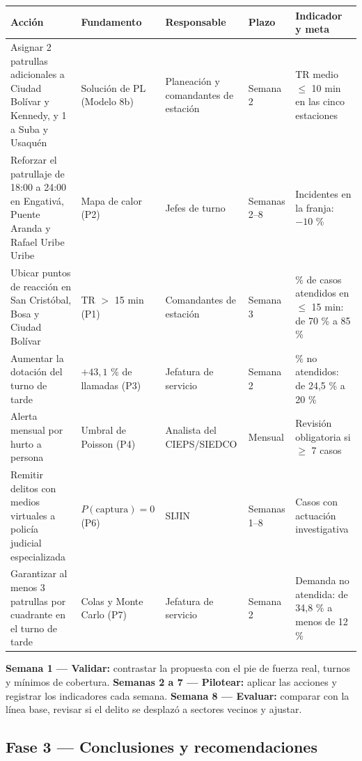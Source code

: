 \begin{center}
\scriptsize
\begin{tabularx}{\textwidth}{@{}p{3.3cm}p{2.6cm}p{2.1cm}p{1.4cm}X@{}}
\toprule
\textbf{Acción} & \textbf{Fundamento} & \textbf{Responsable} & \textbf{Plazo} & \textbf{Indicador y meta}\\
\midrule
Asignar 2 patrullas adicionales a Ciudad Bolívar y Kennedy, y 1 a Suba y Usaquén & Solución de PL (Modelo 8b) & Planeación y comandantes de estación & Semana 2 & TR medio $\le$ 10 min en las cinco estaciones\\[3pt]
Reforzar el patrullaje de 18:00 a 24:00 en Engativá, Puente Aranda y Rafael Uribe Uribe & Mapa de calor (P2) & Jefes de turno & Semanas 2--8 & Incidentes en la franja: $-10$ \%\\[3pt]
Ubicar puntos de reacción en San Cristóbal, Bosa y Ciudad Bolívar & TR $>$ 15 min (P1) & Comandantes de estación & Semana 3 & \% de casos atendidos en $\le$ 15 min: de 70 \% a 85 \%\\[3pt]
Aumentar la dotación del turno de tarde & $+43{,}1$ \% de llamadas (P3) & Jefatura de servicio & Semana 2 & \% no atendidos: de 24,5 \% a 20 \%\\[3pt]
Alerta mensual por hurto a persona & Umbral de Poisson (P4) & Analista del CIEPS/SIEDCO & Mensual & Revisión obligatoria si $\ge$ 7 casos\\[3pt]
Remitir delitos con medios virtuales a policía judicial especializada & $P(\text{captura})=0$ (P6) & SIJIN & Semanas 1--8 & Casos con actuación investigativa\\[3pt]
Garantizar al menos 3 patrullas por cuadrante en el turno de tarde & Colas y Monte Carlo (P7) & Jefatura de servicio & Semana 2 & Demanda no atendida: de 34,8 \% a menos de 12 \%\\
\bottomrule
\end{tabularx}
\end{center}

\begin{cajaInfo}
\textbf{Semana 1 --- Validar:} contrastar la propuesta con el pie de fuerza real, turnos y
mínimos de cobertura. \textbf{Semanas 2 a 7 --- Pilotear:} aplicar las acciones y registrar
los indicadores cada semana. \textbf{Semana 8 --- Evaluar:} comparar con la línea base,
revisar si el delito se desplazó a sectores vecinos y ajustar.
\end{cajaInfo}

\subsection{Fase 3 --- Conclusiones y recomendaciones}

